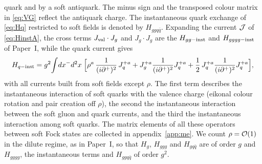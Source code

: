 quark and by a soft antiquark. The minus sign and the transposed colour matrix in \eqref{eq:VG}
reflect the antiquark charge. The instantaneous quark exchange of \eqref{eq:Hq} restricted to soft
fields is denoted by $H_{ggq\bar q}$. Expanding the current $\mathcal{J}$ of \eqref{eq:HinstA}, the
cross terms $J_{\rm val}\cdot J_{g}$ and $J_{g}\cdot J_{g}$ are the $H_{gg-{\rm inst}}$ and
$H_{gggg-{\rm inst}}$ of Paper~I, while the quark current gives
\begin{equation}
H_{q-{\rm inst}}=g^{2}\!\int\!dx^{-}d^{2}x\;\Big[\rho^{a}\,\frac{1}{(i\partial^{+})^{2}}\,J^{+a}_{q}
+J^{+a}_{g}\frac{1}{(i\partial^{+})^{2}}J^{+a}_{q}
+\frac12\,J^{+a}_{q}\frac{1}{(i\partial^{+})^{2}}J^{+a}_{q}\Big],
\label{eq:Hqinst}
\end{equation}
with all currents built from soft fields except $\rho$. The first term describes the
instantaneous interaction of soft quarks with the valence charge (eikonal colour rotation and
pair creation off $\rho$), the second the instantaneous interaction between the soft gluon and
quark currents, and the third the instantaneous interaction among soft quarks. The matrix
elements of all these operators between soft Fock states are collected in
appendix~\ref{app:me}. We count $\rho=\mathcal{O}(1)$ in the dilute regime, as in Paper~I, so that
$H_{g}$, $H_{ggg}$ and $H_{gq\bar q}$ are of order $g$ and $H_{gggg}$, the instantaneous terms and
$H_{ggq\bar q}$ of order $g^{2}$.

